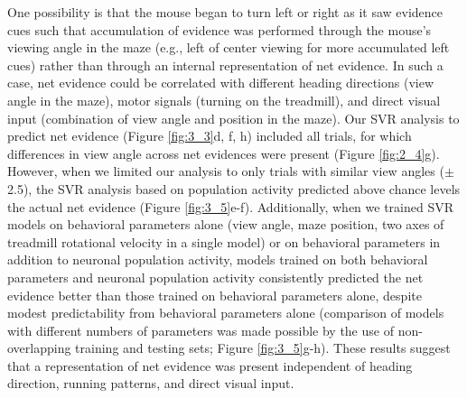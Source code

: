 \bigskip
One possibility is that the mouse began to turn left or right as it saw evidence cues such that accumulation of evidence was performed through the mouse’s viewing angle in the maze (e.g., left of center viewing for more accumulated left cues) rather than through an internal representation of net evidence. In such a case, net evidence could be correlated with different heading directions (view angle in the maze), motor signals (turning on the treadmill), and direct visual input (combination of view angle and position in the maze). Our SVR analysis to predict net evidence (Figure \ref{fig:3_3}d, f, h) included all trials, for which differences in view angle across net evidences were present (Figure \ref{fig:2_4}g). However, when we limited our analysis to only trials with similar view angles ($\pm$ 2.5\textdegree), the SVR analysis based on population activity predicted above chance levels the actual net evidence (Figure \ref{fig:3_5}e-f). Additionally, when we trained SVR models on behavioral parameters alone (view angle, maze position, two axes of treadmill rotational velocity in a single model) or on behavioral parameters in addition to neuronal population activity, models trained on both behavioral parameters and neuronal population activity consistently predicted the net evidence better than those trained on behavioral parameters alone, despite modest predictability from behavioral parameters alone (comparison of models with different numbers of parameters was made possible by the use of non-overlapping training and testing sets; Figure \ref{fig:3_5}g-h). These results suggest that a representation of net evidence was present independent of heading direction, running patterns, and direct visual input.


